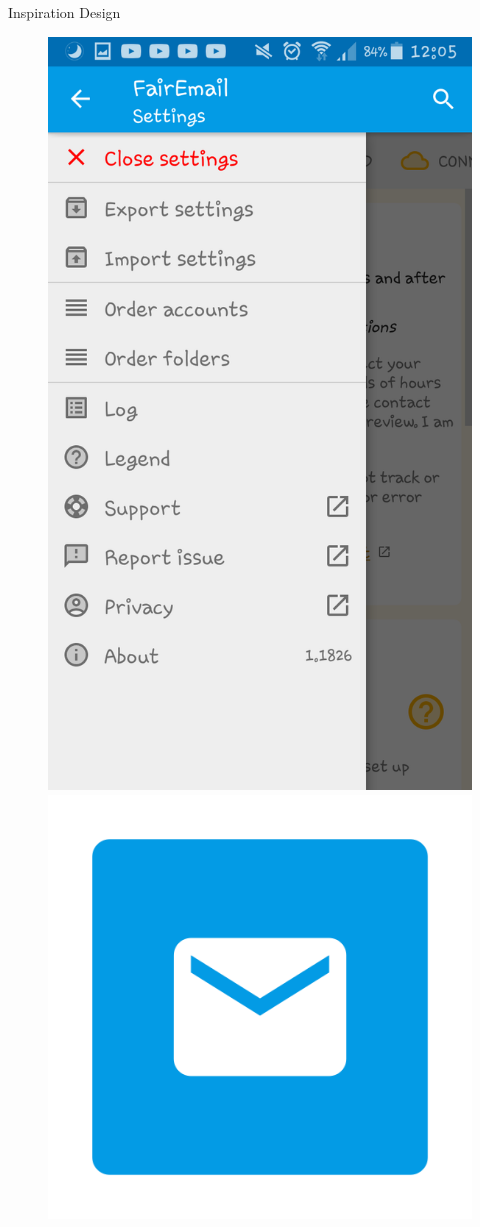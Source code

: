 \documentclass[aspectratio=169]{beamer}
\begin{document}
\begin{frame}[plain]{Inspiration Design}
    \hfill
    \begin{varwidth}{.3\textwidth}\pause
        \begin{figure}
        \centering
        \includegraphics[width=.8\textwidth]{media/fairmail-screenshot.png}\\
        \vspace{.5cm}
        \includegraphics[width=.25\textwidth]{media/fairmail-logo.png}
        \end{figure}
\end{varwidth}
\end{frame}
\end{document}

